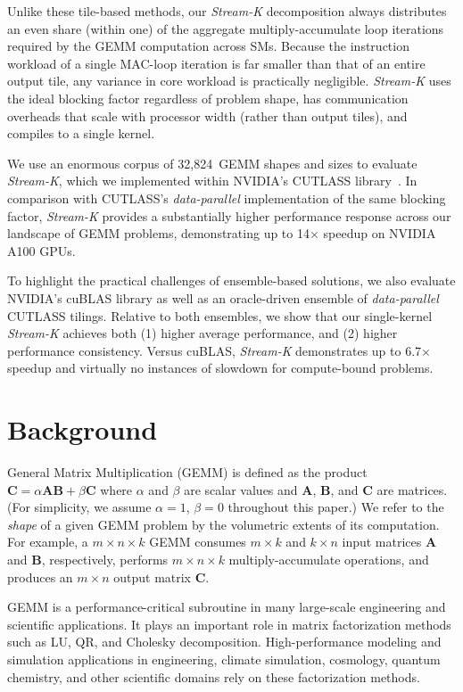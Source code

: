 Unlike these tile-based methods, our \emph{Stream-K} decomposition always distributes an even share (within one) of the aggregate multiply-accumulate loop iterations required by the GEMM computation across SMs.  Because the instruction workload of a single MAC-loop iteration is far smaller than that of an entire output tile, any variance in core workload is practically negligible.  \emph{Stream-K} 
uses the ideal blocking factor regardless of problem shape, has communication overheads that scale with processor width (rather than output tiles), and compiles to a single kernel.

We use an enormous corpus of 32,824~GEMM shapes and sizes to evaluate \emph{Stream-K}, 
which we implemented within NVIDIA's CUTLASS library~\cite{Kerr:2017:CUTLASS}.  In comparison with CUTLASS's \emph{data-parallel} implementation of the same blocking factor, \emph{Stream-K} provides a substantially higher performance response across our landscape of GEMM problems, demonstrating up to 14$\times$ speedup on NVIDIA A100 GPUs.

To highlight the practical challenges of ensemble-based solutions, we also evaluate NVIDIA's cuBLAS library as well as an oracle-driven ensemble of \emph{data-parallel} CUTLASS tilings.  Relative to both ensembles, we show that our single-kernel \emph{Stream-K} achieves both (1) higher average performance, and (2) higher performance consistency. Versus cuBLAS, \emph{Stream-K} 
demonstrates up to 6.7$\times$ speedup and virtually no instances of slowdown for compute-bound problems.

\section{Background}

General Matrix Multiplication (GEMM) is defined as the product $\textbf{C} = \alpha\textbf{AB} + \beta\textbf{C}$ where $\alpha$ and $\beta$ are scalar values and $\textbf{A}$, $\textbf{B}$, and $\textbf{C}$ are matrices. (For simplicity, we assume $\alpha = 1$, $\beta = 0$ throughout this paper.) We refer to the \emph{shape} of a given GEMM problem by the volumetric extents of its computation. For example, a $m\times n \times k$ GEMM consumes $m \times k$ and $k \times n$ input matrices \textbf{A} and \textbf{B}, respectively, performs $m\times n\times k$ multiply-accumulate operations, and produces an $m \times n$ output matrix \textbf{C}.

GEMM is a performance-critical subroutine in many large-scale engineering and scientific applications. It plays an important role in matrix factorization methods such as LU, QR, and Cholesky decomposition. High-performance modeling and simulation applications in engineering, climate simulation, cosmology, quantum chemistry, and other scientific domains rely on these factorization methods.

